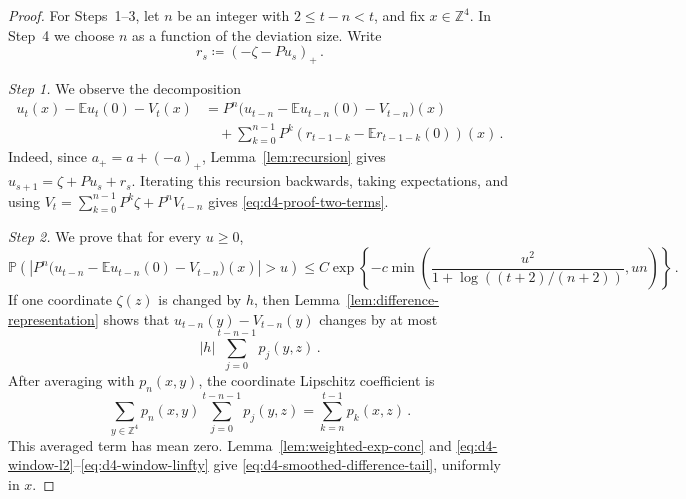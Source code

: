 \documentclass[11pt]{amsart}
\theoremstyle{plain}
\theoremstyle{definition}
\newcommand{\Z}{\mathbb{Z}}
\newcommand{\E}{\mathbb{E}}
\renewcommand{\P}{\mathbb{P}}
\begin{document}
		\begin{proof}
			For Steps~1--3, let $n$ be an integer with $2\leq t-n<t$, and fix
			$x\in\Z^4$. In Step~4 we choose $n$ as a function of the deviation
			size.
			Write
			\[
				r_s\coloneqq(-\zeta-Pu_s)_+\, .
			\]

			\emph{Step 1.}
			We observe the decomposition 
			\begin{equation}\label{eq:d4-proof-two-terms}
			\begin{aligned}
				u_t(x)-\E u_t(0)-V_t(x)
				&=
				P^n\bigl(u_{t-n}-\E u_{t-n}(0)-V_{t-n}\bigr)(x)\\
				&\quad+
				\sum_{k=0}^{n-1}P^k
				\left(r_{t-1-k}-\E r_{t-1-k}(0)\right)(x)\, .
			\end{aligned}
			\end{equation}
			Indeed, since $a_+=a+(-a)_+$, Lemma~\ref{lem:recursion} gives
			$u_{s+1}=\zeta+Pu_s+r_s$. Iterating this recursion backwards,
			taking expectations, and using
			$V_t=\sum_{k=0}^{n-1}P^k\zeta+P^nV_{t-n}$ gives
			\eqref{eq:d4-proof-two-terms}.

			\emph{Step 2.}
			We prove that for every $u\geq0$,
			\begin{equation}\label{eq:d4-smoothed-difference-tail}
				\P\left(
				\left|
				P^n\bigl(u_{t-n}-\E u_{t-n}(0)-V_{t-n}\bigr)(x)
				\right|>u
				\right)
				\leq
				C\exp\left\{
				-c\min\left(
				\frac{u^2}{1+\log((t+2)/(n+2))},un
				\right)
				\right\}\, .
			\end{equation}
			If one coordinate $\zeta(z)$ is changed by $h$, then
			Lemma~\ref{lem:difference-representation} shows that
			$u_{t-n}(y)-V_{t-n}(y)$ changes by at most
			\[
				|h|\sum_{j=0}^{t-n-1}p_j(y,z)\, .
			\]
			After averaging with $p_n(x,y)$, the coordinate Lipschitz coefficient
			is
			\[
				\sum_{y\in\Z^4}p_n(x,y)\sum_{j=0}^{t-n-1}p_j(y,z)
				=
				\sum_{k=n}^{t-1}p_k(x,z)\, .
			\]
			This averaged term has mean zero. Lemma~\ref{lem:weighted-exp-conc}
			and
			\eqref{eq:d4-window-l2}--\eqref{eq:d4-window-linfty} give
			\eqref{eq:d4-smoothed-difference-tail}, uniformly in $x$.


\end{proof}
\end{document}
